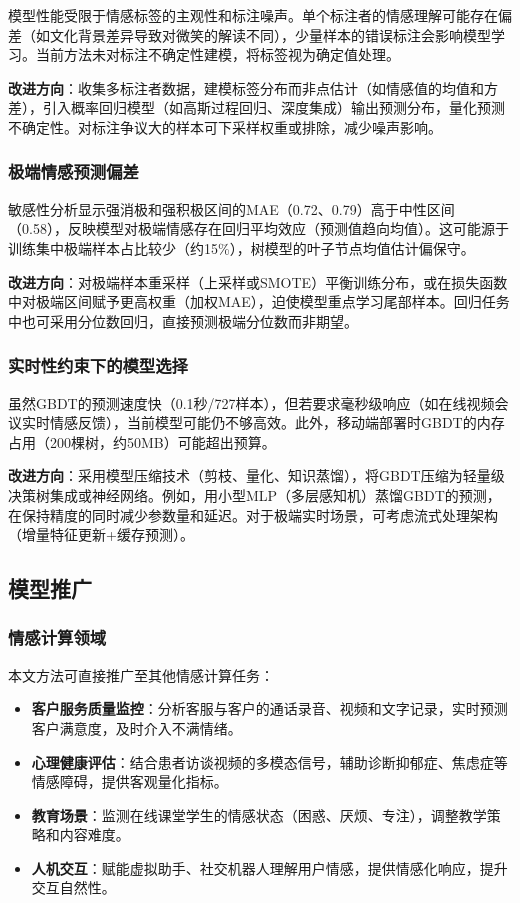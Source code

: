 模型性能受限于情感标签的主观性和标注噪声。单个标注者的情感理解可能存在偏差（如文化背景差异导致对微笑的解读不同），少量样本的错误标注会影响模型学习。当前方法未对标注不确定性建模，将标签视为确定值处理。

\textbf{改进方向}：收集多标注者数据，建模标签分布而非点估计（如情感值的均值和方差），引入概率回归模型（如高斯过程回归、深度集成）输出预测分布，量化预测不确定性。对标注争议大的样本可下采样权重或排除，减少噪声影响。

\subsubsection{极端情感预测偏差}

敏感性分析显示强消极和强积极区间的MAE（0.72、0.79）高于中性区间（0.58），反映模型对极端情感存在回归平均效应（预测值趋向均值）。这可能源于训练集中极端样本占比较少（约15\%），树模型的叶子节点均值估计偏保守。

\textbf{改进方向}：对极端样本重采样（上采样或SMOTE）平衡训练分布，或在损失函数中对极端区间赋予更高权重（加权MAE），迫使模型重点学习尾部样本。回归任务中也可采用分位数回归，直接预测极端分位数而非期望。

\subsubsection{实时性约束下的模型选择}

虽然GBDT的预测速度快（0.1秒/727样本），但若要求毫秒级响应（如在线视频会议实时情感反馈），当前模型可能仍不够高效。此外，移动端部署时GBDT的内存占用（200棵树，约50MB）可能超出预算。

\textbf{改进方向}：采用模型压缩技术（剪枝、量化、知识蒸馏），将GBDT压缩为轻量级决策树集成或神经网络。例如，用小型MLP（多层感知机）蒸馏GBDT的预测，在保持精度的同时减少参数量和延迟。对于极端实时场景，可考虑流式处理架构（增量特征更新+缓存预测）。

\subsection{模型推广}

\subsubsection{情感计算领域}

本文方法可直接推广至其他情感计算任务：

\begin{itemize}
\item \textbf{客户服务质量监控}：分析客服与客户的通话录音、视频和文字记录，实时预测客户满意度，及时介入不满情绪。
\item \textbf{心理健康评估}：结合患者访谈视频的多模态信号，辅助诊断抑郁症、焦虑症等情感障碍，提供客观量化指标。
\item \textbf{教育场景}：监测在线课堂学生的情感状态（困惑、厌烦、专注），调整教学策略和内容难度。
\item \textbf{人机交互}：赋能虚拟助手、社交机器人理解用户情感，提供情感化响应，提升交互自然性。
\end{itemize}

